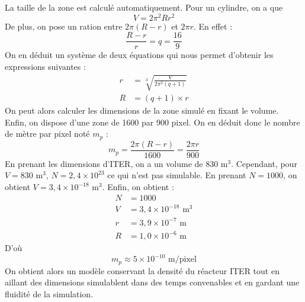 \documentclass{article}
\begin{document}
\label{Volume et dimension}
La taille de la zone est calculé automatiquement. Pour un cylindre, on a que
\[ V = 2\pi^2Rr^2 \]
De plus, on pose un ration entre $2\pi(R-r)$ et $2\pi r$. En effet :
\[ \frac{R-r}{r} = q =\frac{16}{9} \]
On en déduit un système de deux équations qui nous permet d'obtenir les expressions suivantes :
\begin{align*}
    r &= \sqrt[3]{\frac{V}{2\pi^2(q+1)}} \\
    R &= (q+1)\times r
\end{align*}
On peut alors calculer les dimensions de la zone simulé en fixant le volume. \\
Enfin, on dispose d'une zone de 1600 par 900 pixel. On en déduit donc le nombre de mètre par pixel noté $m_p$ :
\[ m_p = \frac{2\pi(R-r)}{1600} = \frac{2\pi r}{900} \]
En prenant les dimensions d'ITER, on a un volume de 830 m$^3$. Cependant, pour $V = 830\text{ m}^3$, $N=2,4\times10^{23}$ ce qui n'est pas simulable. En prenant $N=1000$, on obtient $V = 3,4\times10^{-18}\text{ m}^3$. Enfin, on obtient :
\begin{align*}
    N &= 1000 \\
    V &= 3,4\times10^{-18}\text{ m}^3 \\
    r &= 3,9\times10^{-7}\text{ m} \\
    R &= 1,0\times10^{-6}\text{ m}
\end{align*}
D'où
\[ m_p \approx 5\times10^{-10}\text{ m/pixel} \]
On obtient alors un modèle conservant la densité du réacteur ITER tout en aillant des dimensions simulablent dans des temps convenables et en gardant une fluidité de la simulation.
\end{document}
